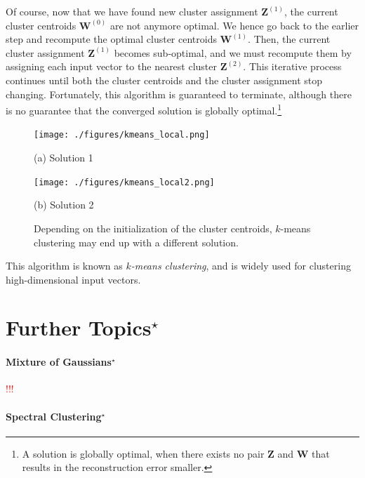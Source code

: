 \documentclass{report}
\newcommand{\matr}[1]{\mathbf{#1}}
\newcommand{\mW}[0]{\matr{W}}
\newcommand{\mZ}[0]{\matr{Z}}
\newcommand{\todo}[1]{{\Large\textcolor{red}{#1}}}
\begin{document}
Of course, now that we have found new cluster assignment $\mZ^{(1)}$, the
current cluster centroids $\mW^{(0)}$ are not anymore optimal. We hence go back
to the earlier step and recompute the optimal cluster centroids $\mW^{(1)}$.
Then, the current cluster assignment $\mZ^{(1)}$ becomes sub-optimal, and we
must recompute them by assigning each input vector to the nearest cluster
$\mZ^{(2)}$. This iterative process continues until both the cluster centroids
and the cluster assignment stop changing. Fortunately, this algorithm is
guaranteed to terminate, although there is no guarantee that the converged
solution is globally optimal.\footnote{
    A solution is globally optimal, when there exists no pair $\mZ$ and $\mW$
    that results in the reconstruction error smaller.
}

\begin{figure}[t]
    \begin{minipage}{0.48\textwidth}
        \centering
        \texttt{[image: ./figures/kmeans\_local.png]}

        (a) Solution 1
    \end{minipage}
    \hfill
    \begin{minipage}{0.48\textwidth}
        \centering
        \texttt{[image: ./figures/kmeans\_local2.png]}

        (b) Solution 2
    \end{minipage}
    \caption{
        \label{fig:kmeans_local}
        Depending on the initialization of the cluster centroids, $k$-means
        clustering may end up with a different solution.
    }
\end{figure}

This algorithm is known as {\it $k$-means clustering}, and is widely used for
clustering high-dimensional input vectors. 

\section{Further Topics$^\star$}

\paragraph{Mixture of Gaussians$^\star$}

\todo{!!!}

\paragraph{Spectral Clustering$^\star$}
\end{document}
